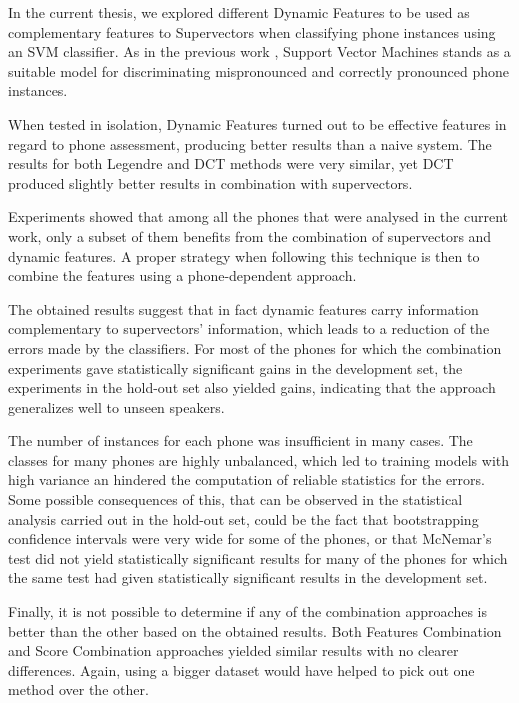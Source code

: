 In the current thesis, we explored different Dynamic Features to be used as complementary features to
Supervectors when classifying phone instances using an SVM classifier. As in the previous work \cite{main},
Support Vector Machines stands as a suitable model for discriminating mispronounced and correctly
pronounced phone instances.

When tested in isolation, Dynamic Features turned out to be effective features in regard to
phone assessment, producing better results than a naive system.
The results for both
Legendre and DCT methods were very similar, yet DCT produced slightly better results in combination with
supervectors.

Experiments showed that among all the phones that were analysed in the current work, only a subset of them
benefits from the combination of supervectors and dynamic features. A proper strategy when following this
technique is then to combine the features using a phone-dependent approach.

The obtained results suggest that in fact dynamic features carry
information complementary to supervectors' information, which leads to a reduction of the errors
made by the classifiers. For most of the phones for which the combination experiments gave statistically significant gains in the development set, the experiments in the hold-out set also yielded gains,
indicating that the approach generalizes well to unseen speakers.

The number of instances for each phone was insufficient in many cases. The classes for many
phones are highly unbalanced, which led to training models with high variance an
hindered the computation of reliable statistics for the errors.
Some possible consequences
of this, that can be observed in the statistical analysis carried out in the hold-out set,
could be the fact that bootstrapping
confidence intervals were very wide for some of the phones,
or that McNemar's test did not yield statistically significant results for many of the phones
for which the same test had given statistically significant results in the development set.

Finally, it is not possible to determine if any of the combination approaches is better than the other based
on the obtained results. Both Features Combination and Score Combination approaches yielded
similar results with no clearer differences. Again, using a bigger dataset would have helped to pick out one
method over the other.
